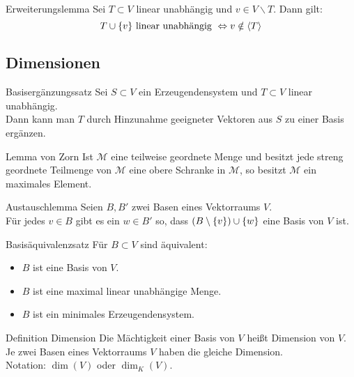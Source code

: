 \documentclass[main.tex]{subfiles}
\begin{document}
\begin{karte}{Erweiterungslemma}
    Sei \(T \subset V\) linear unabhängig und \(v \in V \backslash T \). Dann gilt: 
    \[T \cup \{v\} \text{ linear unabhängig } 
    \Leftrightarrow v \notin \langle T \rangle \]
\end{karte}
\subsection*{Dimensionen}
\begin{karte}{Basisergänzungssatz}
    Sei \(S \subset V\) ein Erzeugendensystem und \(T \subset V\)
    linear unabhängig. \\
    Dann kann man \(T\) durch Hinzunahme geeigneter Vektoren aus \(S\)
    zu einer Basis ergänzen.
\end{karte}
\begin{karte}{Lemma von Zorn}
    Ist \(\mathcal{M}\) eine teilweise geordnete Menge und besitzt
    jede streng geordnete Teilmenge von \(\mathcal{M}\) eine obere 
    Schranke in \(\mathcal{M}\), so besitzt \(\mathcal{M}\) 
    ein maximales Element.
\end{karte}
\begin{karte}{Austauschlemma}
    Seien \(B, B'\) zwei Basen eines Vektorraums \(V\). \\ 
    Für jedes \(v \in B \) gibt es ein \(w \in B'\) so, 
    dass \((B \setminus \{v\}) \cup \{w\}\) 
    eine Basis von \(V\) ist.
\end{karte}
\begin{karte}{Basisäquivalenzsatz} %
    Für \(B \subset V\) sind äquivalent: 
    \begin{itemize}
        \item \(B\) ist eine Basis von \(V\).
        \item \(B\) ist eine maximal linear unabhängige Menge.
        \item \(B\) ist ein minimales Erzeugendensystem.
    \end{itemize}
\end{karte}
\begin{karte}{Definition Dimension}
    Die Mächtigkeit einer Basis von \(V\) heißt Dimension von \(V\). \\ 
    Je zwei Basen eines Vektorraums \(V\) haben die gleiche Dimension. \\
    Notation: \( \dim(V) \) oder \( \dim_K(V) \).
\end{karte}
\end{document}
